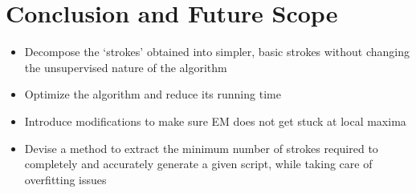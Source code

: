 \documentclass[10pt]{article}
\begin{document}
	\section{Conclusion and Future Scope}
		\begin{itemize}
			\item 
			Decompose the ‘strokes’ obtained into simpler, basic strokes without changing the unsupervised nature of the algorithm
			\item
			Optimize the algorithm and reduce its running time
			\item
			Introduce modifications to make sure EM does not get stuck at local maxima
			\item
			Devise a method to extract the minimum number of strokes required to completely and accurately generate a given script, while taking care of overfitting issues
		\end{itemize}	
	\printbibliography	
\end{document}
